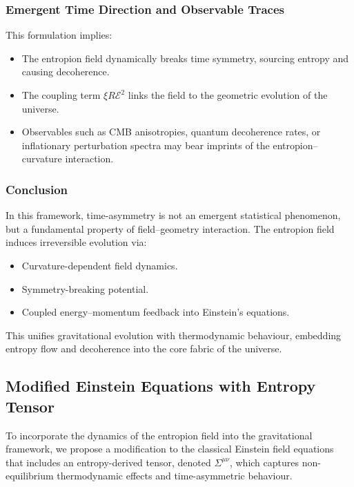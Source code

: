\documentclass[12pt]{article}
\begin{document}
\subsubsection*{Emergent Time Direction and Observable Traces}

This formulation implies:

\begin{itemize}
    \item The entropion field dynamically breaks time symmetry, sourcing entropy and causing decoherence.
    \item The coupling term \( \xi R \mathcal{E}^2 \) links the field to the geometric evolution of the universe.
    \item Observables such as CMB anisotropies, quantum decoherence rates, or inflationary perturbation spectra may bear imprints of the entropion–curvature interaction.
\end{itemize}

\subsubsection*{Conclusion}

In this framework, time-asymmetry is not an emergent statistical phenomenon, but a fundamental property of field–geometry interaction. The entropion field induces irreversible evolution via:

\begin{itemize}
    \item Curvature-dependent field dynamics.
    \item Symmetry-breaking potential.
    \item Coupled energy–momentum feedback into Einstein’s equations.
\end{itemize}

This unifies gravitational evolution with thermodynamic behaviour, embedding entropy flow and decoherence into the core fabric of the universe.

\subsection{Modified Einstein Equations with Entropy Tensor}

To incorporate the dynamics of the entropion field into the gravitational framework, we propose a modification to the classical Einstein field equations that includes an entropy-derived tensor, denoted \( \Sigma^{\mu\nu} \), which captures non-equilibrium thermodynamic effects and time-asymmetric behaviour.
\end{document}
